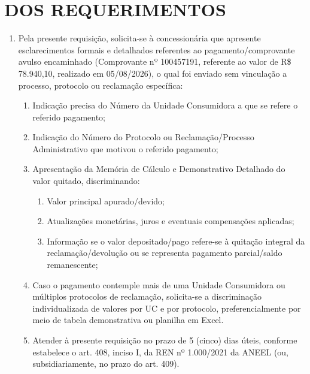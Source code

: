 \newcommand{\tipoRequerimento}{Solicitação de Esclarecimento sobre Pagamento Avulso e Identificação de Origem (UC e Reclamação)}
\newcommand{\empresaDocumentos}{intro,final}

\section{DOS REQUERIMENTOS}

\begin{enumerate}[resume]
\item Pela presente requisição, solicita-se à concessionária que apresente esclarecimentos formais e detalhados referentes ao pagamento/comprovante avulso encaminhado (Comprovante nº 100457191, referente ao valor de R\$ 78.940,10, realizado em 05/08/2026), o qual foi enviado sem vinculação a processo, protocolo ou reclamação específica:
\begin{enumerate}
  \item Indicação precisa do Número da Unidade Consumidora a que se refere o referido pagamento;
  \item Indicação do Número do Protocolo ou Reclamação/Processo Administrativo que motivou o referido pagamento;
  \item Apresentação da Memória de Cálculo e Demonstrativo Detalhado do valor quitado, discriminando:
  \begin{enumerate}
    \item Valor principal apurado/devido;
    \item Atualizações monetárias, juros e eventuais compensações aplicadas;
    \item Informação se o valor depositado/pago refere-se à quitação integral da reclamação/devolução ou se representa pagamento parcial/saldo remanescente;
  \end{enumerate}
  \item Caso o pagamento contemple mais de uma Unidade Consumidora ou múltiplos protocolos de reclamação, solicita-se a discriminação individualizada de valores por UC e por protocolo, preferencialmente por meio de tabela demonstrativa ou planilha em Excel.
  \item Atender à presente requisição no prazo de 5 (cinco) dias úteis, conforme estabelece o art. 408, inciso I, da REN nº 1.000/2021 da ANEEL (ou, subsidiariamente, no prazo do art. 409).
\end{enumerate}
\end{enumerate}

